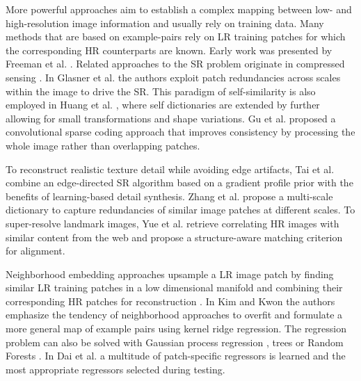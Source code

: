 \documentclass[10pt,twocolumn,letterpaper]{article}
\begin{document}
	More powerful approaches aim to establish a complex mapping between low- and high-resolution image information and usually rely on training data. 
	Many methods that are based on example-pairs rely on \ac{LR} training patches for which the corresponding \ac{HR} counterparts are known. Early work was presented by Freeman et al. \cite{Freeman2000,Freeman2002}.
	Related approaches to the \ac{SR} problem originate in compressed sensing \cite{Yang08, Dong2011, zeyde2012single}.
	In Glasner et al. \cite{glasner2009super} the authors exploit patch redundancies across scales within the image to drive the \ac{SR}. This paradigm of self-similarity is also employed in Huang et al. \cite{Huang15selfexemplars}, where self dictionaries are extended by further allowing for small transformations and shape variations.
	Gu et al. \cite{gu2015convolutional} proposed a convolutional sparse coding approach that improves consistency by processing the whole image rather than overlapping patches.
	
	To reconstruct realistic texture detail while avoiding edge artifacts, Tai et al. \cite{Tai2010} combine an edge-directed \ac{SR} algorithm based on a gradient profile prior \cite{Sun2008} with the benefits of learning-based detail synthesis. Zhang et al. \cite{zhang2012multi} propose a multi-scale dictionary to capture redundancies of similar image patches at different scales. %
	To super-resolve landmark images, Yue et al. \cite{Yue2013} retrieve correlating \ac{HR} images with similar content from the web and propose a structure-aware matching criterion for alignment.
	
	Neighborhood embedding approaches upsample a \ac{LR} image patch by finding similar \ac{LR} training patches in a low dimensional manifold and combining their corresponding \ac{HR} patches for reconstruction \cite{timofte2013anchored,timofte2014a+}.
	In Kim and Kwon \cite{Kim10kernelregression} the authors emphasize the tendency of neighborhood approaches to overfit and formulate a more general map of example pairs using kernel ridge regression.
	The regression problem can also be solved with Gaussian process regression \cite{he2011single}, trees \cite{salvador2015naive} or Random Forests \cite{schulter2015fast}.
	In Dai et al. \cite{dai2015jointly} a multitude of patch-specific regressors is learned and the most appropriate regressors selected during testing. %
 
\end{document}
